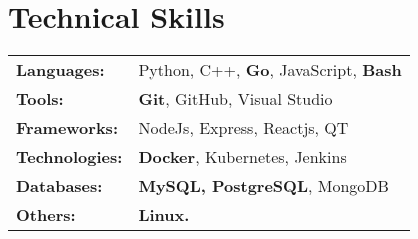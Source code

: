 \documentclass[letterpaper,12.32pt]{article}
\makeatletter
\newcommand{\resumeItem}[1]{
  \item\small{
    {#1 \vspace{-2pt}}
  }
}
\newcommand{\resumeProjectHeading}[2]{
    \item
    \begin{tabular*}{0.97\textwidth}{l@{\extracolsep{\fill}}r}
      \small#1 & #2 \\
    \end{tabular*}\vspace{-2pt}
}
\newcommand{\resumeSubHeadingListStart}{\begin{itemize}[leftmargin=0.15in, label={}]}
\newcommand{\resumeItemListStart}{\begin{itemize}}
\newcommand{\resumeItemListEnd}{\end{itemize}\vspace{0pt}}
\makeatother
\begin{document}
\section{Technical Skills}
\begin{tabularx}{\textwidth}{lX}
\vspace{1pt}
\textbf{Languages:} & \hspace{0.1cm} \small{Python, C++, \textbf{Go}, JavaScript, \textbf{Bash}} \\
\vspace{1pt}
\textbf{Tools:} & \hspace{0.1cm} \small{\textbf{Git}, GitHub, Visual Studio} \\
\vspace{1pt}
\textbf{Frameworks:} & \hspace{0.1cm} \small{NodeJs, Express, Reactjs, QT} \\
\vspace{1pt}
\textbf{Technologies:} & \hspace{0.1cm} \small{\textbf{Docker}, Kubernetes, Jenkins} \\
\vspace{1pt}
\textbf{Databases:} & \hspace{0.1cm} \small{\textbf{MySQL, PostgreSQL}, MongoDB} \\
\vspace{1pt}
\textbf{Others:} & \hspace{0.1cm} \small{\textbf{Linux.}} \\
\end{tabularx}



\end{document}
